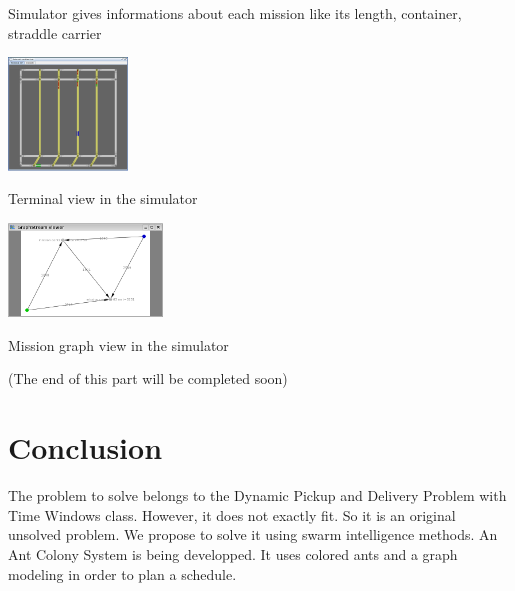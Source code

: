 \documentclass[a4paper,10pt]{article}
\makeatletter
\newenvironment{figurehere}
{\def\@captype{figure}}
{}
\makeatother
\begin{document}
\begin{multicols}{2}
		Simulator gives informations about each mission like its length, container, straddle carrier 
		\begin{figurehere}
		 	\begin{center}
				\includegraphics[height=3cm]{Shemas/terminal.png}
				\caption{Terminal view in the simulator}
				\label{tview}
			\end{center}
		\end{figurehere}
		\begin{figurehere}
		 	\begin{center}
				\includegraphics[height=2.5cm]{Shemas/acocapture.png}
				\caption{Mission graph view in the simulator}
				\label{acoview}
			\end{center}
		\end{figurehere}
		
		(The end of this part will be completed soon)

	\section*{Conclusion}
	The problem to solve belongs to the Dynamic Pickup and Delivery Problem with Time Windows class. However, it does not exactly fit. So it is an original unsolved problem. We propose to solve it using swarm intelligence methods. An Ant Colony System is being developped. It uses colored ants and a graph modeling in order to plan a schedule.
	
	
	
\end{multicols}
\end{document}
